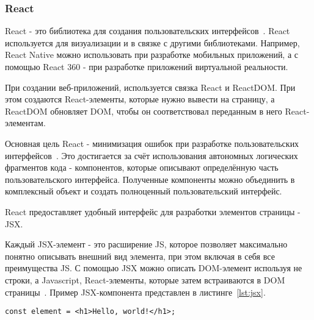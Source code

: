 \subsubsection{React}

React - это библиотека для создания пользовательских интерфейсов~\cite{React}. React используется для визуализации и в связке с другими библиотеками. Например, React Native можно использовать при разработке мобильных приложений, а с помощью React 360 - при разработке приложений виртуальной реальности.

При создании веб-приложений, используется связка React и ReactDOM. При этом создаются React-элементы, которые нужно вывести на страницу, а ReactDOM обновляет DOM, чтобы он соответствовал переданным в него React-элементам.

Основная цель React - минимизация ошибок при разработке пользовательских интерфейсов~\cite{React}. Это достигается за счёт использования автономных логических фрагментов кода - компонентов, которые описывают определённую часть пользовательского интерфейса. Полученные компоненты можно объединить в комплексный объект и создать полноценный пользовательский интерфейс.

React предоставляет удобный интерфейс для разработки элементов страницы - JSX.

Каждый JSX-элемент - это расширение JS, которое позволяет максимально понятно описывать внешний вид элемента, при этом включая в себя все преимущества JS. С помощью JSX можно описать DOM-элемент используя не строки, а Javascript, React-элементы, которые затем встраиваются в DOM страницы~\cite{React}. Пример JSX-компонента представлен в листинге~\ref{lst:jsx}.

\begin{lstlisting}[style=ES6, caption={Пример JSX-элемента}, label = {lst:jsx}]
  const element = <h1>Hello, world!</h1>;
\end{lstlisting}